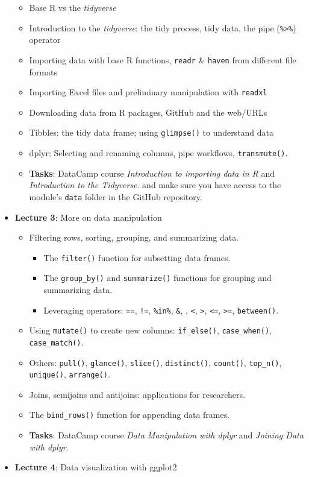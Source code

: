 \documentclass[
  letterpaper,
  DIV=11,
  numbers=noendperiod]{scrartcl}
\providecommand{\tightlist}{%
  \setlength{\itemsep}{0pt}\setlength{\parskip}{0pt}}\usepackage{longtable,booktabs,array}
\begin{document}
\begin{itemize}
  \begin{itemize}
  \tightlist
  \item
    Base R vs the \emph{tidyverse}
  \item
    Introduction to the \emph{tidyverse}: the tidy process, tidy data,
    the pipe (\texttt{\%\textgreater{}\%}) operator
  \item
    Importing data with base R functions, \texttt{readr} \&
    \texttt{haven} from different file formats
  \item
    Importing Excel files and preliminary manipulation with
    \texttt{readxl}
  \item
    Downloading data from R packages, GitHub and the web/URLs
  \item
    Tibbles: the tidy data frame; using \texttt{glimpse()} to understand
    data
  \item
    dplyr: Selecting and renaming columns, pipe workflows,
    \texttt{transmute()}.
  \item
    \textbf{Tasks}: DataCamp course \emph{Introduction to importing data
    in R} and \emph{Introduction to the Tidyverse}. and make sure you
    have access to the module's \texttt{data} folder in the GitHub
    repository.
  \end{itemize}
\item
  \textbf{Lecture 3}: More on data manipulation

  \begin{itemize}
  \tightlist
  \item
    Filtering rows, sorting, grouping, and summarizing data.

    \begin{itemize}
    \tightlist
    \item
      The \texttt{filter()} function for subsetting data frames.
    \item
      The \texttt{group\_by()} and \texttt{summarize()} functions for
      grouping and summarizing data.
    \item
      Leveraging operators: \texttt{==}, \texttt{!=}, \texttt{\%in\%},
      \texttt{\&}, \texttt{\textbar{}}, \texttt{\textless{}},
      \texttt{\textgreater{}}, \texttt{\textless{}=},
      \texttt{\textgreater{}=}, \texttt{between()}.
    \end{itemize}
  \item
    Using \texttt{mutate()} to create new columns: \texttt{if\_else()},
    \texttt{case\_when()}, \texttt{case\_match()}.
  \item
    Others: \texttt{pull()}, \texttt{glance()}, \texttt{slice()},
    \texttt{distinct()}, \texttt{count()}, \texttt{top\_n()},
    \texttt{unique()}, \texttt{arrange()}.
  \item
    Joins, semijoins and antijoins: applications for researchers.
  \item
    The \texttt{bind\_rows()} function for appending data frames.
  \item
    \textbf{Tasks}: DataCamp course \emph{Data Manipulation with dplyr}
    and \emph{Joining Data with dplyr}.
  \end{itemize}
\item
  \textbf{Lecture 4}: Data visualization with ggplot2


\end{itemize}
\end{document}

